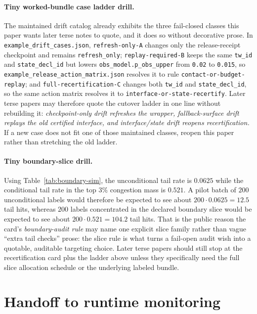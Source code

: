 \documentclass[11pt]{article}
\begin{document}
\paragraph{Tiny worked-bundle case ladder drill.}
The maintained drift catalog already exhibits the three fail-closed classes this paper wants later terse notes to quote, and it does so without decorative prose.
In \texttt{example\_drift\_cases.json}, \texttt{refresh-only-A} changes only the release-receipt checkpoint and remains \texttt{refresh\_only}; \texttt{replay-required-B} keeps the same \texttt{tw\_id} and \texttt{state\_decl\_id} but lowers \texttt{obs\_model.p\_obs\_upper} from \texttt{0.02} to \texttt{0.015}, so \texttt{example\_release\_action\_matrix.json} resolves it to rule \texttt{contact-or-budget-replay}; and \texttt{full-recertification-C} changes both \texttt{tw\_id} and \texttt{state\_decl\_id}, so the same action matrix resolves it to \texttt{interface-or-state-recertify}.
Later terse papers may therefore quote the cutover ladder in one line without rebuilding it: \emph{checkpoint-only drift refreshes the wrapper, fallback-surface drift replays the old certified interface, and interface/state drift reopens recertification.}
If a new case does not fit one of those maintained classes, reopen this paper rather than stretching the old ladder.

\paragraph{Tiny boundary-slice drill.}
Using Table~\ref{tab:boundary-sim}, the unconditional tail rate is $0.0625$ while the conditional tail rate in the top $3\%$ congestion mass is $0.521$.
A pilot batch of $200$ unconditional labels would therefore be expected to see about $200\cdot 0.0625 = 12.5$ tail hits, whereas $200$ labels concentrated in the declared boundary slice would be expected to see about $200\cdot 0.521 = 104.2$ tail hits.
That is the public reason the card's \emph{boundary-audit rule} may name one explicit slice family rather than vague ``extra tail checks'' prose: the slice rule is what turns a fail-open audit wish into a quotable, auditable targeting choice.
Later terse papers should still stop at the recertification card plus the ladder above unless they specifically need the full slice allocation schedule or the underlying labeled bundle.

\section{Handoff to runtime monitoring}
\end{document}
